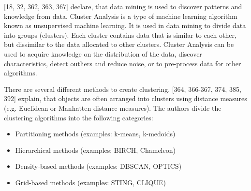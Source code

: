 




\textcite{han2011data}[18, 32, 362, 363, 367] declare, that data mining is used to discover patterns and knowledge from data.
Cluster Analysis is a type of machine learning algorithm known as unsupervised machine learning. It is used in data mining to divide data into groups (clusters). Each cluster contains data that is similar to each other, but dissimilar to the data allocated to other clusters. Cluster Analysis can be used to acquire knowledge on the distribution of the data, discover characteristics, detect outliers and reduce noise, or to pre-process data for other algorithms. 

There are several different methods to create clustering. \textcite{han2011data}[364, 366-367, 374, 385, 392] explain, that objects are often arranged into clusters using distance measures (e.g. Euclidean or Manhatten distance measures). 
The authors divide the clustering algorithms into the following categories:
\begin{itemize}
	\item Partitioning methods (examples: k-means, k-medoids)
	\item Hierarchical methods (examples: BIRCH, Chameleon)
	\item Density-based methods (examples: DBSCAN, OPTICS)
	\item Grid-based methods (examples: STING, CLIQUE)
\end{itemize}



